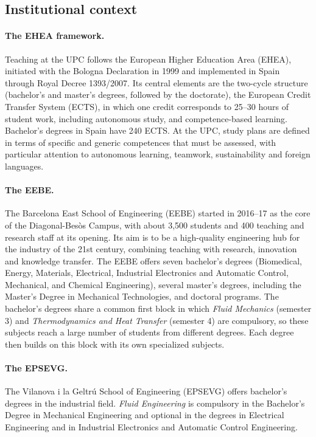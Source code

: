 \documentclass[11pt]{article}
\begin{document}
\subsection{Institutional context}\label{sec:context}
\paragraph{The EHEA framework.} Teaching at the UPC follows the European Higher Education
Area (EHEA), initiated with the Bologna Declaration in 1999 and implemented in Spain
through Royal Decree 1393/2007. Its central elements are the two-cycle structure
(bachelor's and master's degrees, followed by the doctorate), the European Credit Transfer
System (ECTS), in which one credit corresponds to 25--30 hours of student work, including
autonomous study, and competence-based learning. Bachelor's degrees in Spain have 240
ECTS. At the UPC, study plans are defined in terms of specific and generic competences
that must be assessed, with particular attention to autonomous learning, teamwork,
sustainability and foreign languages.

\paragraph{The EEBE.} The Barcelona East School of Engineering (EEBE) started in 2016--17
as the core of the Diagonal-Bes\`os Campus, with about 3,500 students and 400 teaching and
research staff at its opening. Its aim is to be a high-quality engineering hub for the
industry of the 21st century, combining teaching with research, innovation and knowledge
transfer. The EEBE offers seven bachelor's degrees (Biomedical, Energy, Materials,
Electrical, Industrial Electronics and Automatic Control, Mechanical, and Chemical
Engineering), several master's degrees, including the Master's Degree in Mechanical
Technologies, and doctoral programs. The bachelor's degrees share a common first block in
which \emph{Fluid Mechanics} (semester 3) and \emph{Thermodynamics and Heat Transfer}
(semester 4) are compulsory, so these subjects reach a large number of students from
different degrees. Each degree then builds on this block with its own specialized
subjects.

\paragraph{The EPSEVG.} The Vilanova i la Geltr\'u School of Engineering (EPSEVG) offers
bachelor's degrees in the industrial field. \emph{Fluid Engineering} is compulsory in the
Bachelor's Degree in Mechanical Engineering and optional in the degrees in Electrical
Engineering and in Industrial Electronics and Automatic Control Engineering.
\end{document}
